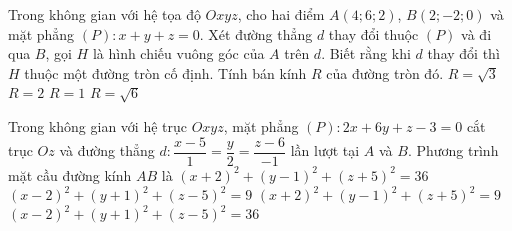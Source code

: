 \begin{ex}%
	Trong không gian với hệ tọa độ $Oxyz$, cho hai điểm $A(4;6;2)$, $B(2;-2;0)$ và mặt phẳng $(P)\colon x+y+z=0$. Xét đường thẳng $d$ thay đổi thuộc $(P)$ và đi qua $B$, gọi $H$ là hình chiếu vuông góc của $A$ trên $d$. Biết rằng khi $d$ thay đổi thì $H$ thuộc một đường tròn cố định. Tính bán kính $R$ của đường tròn đó.
	\choice 
		{$R=\sqrt{3}$}
		{$R=2$}
		{$R=1$}
		{\True $R=\sqrt{6}$}
\end{ex}

\begin{ex}%
	Trong không gian với hệ trục $Oxyz$, mặt phẳng $(P)\colon 2x+6y+z-3=0$ cắt trục $Oz$ và đường thẳng $d\colon \dfrac{x-5}{1}=\dfrac{y}{2}=\dfrac{z-6}{-1}$ lần lượt tại $A$ và $B$. Phương trình mặt cầu đường kính $AB$ là
	\choice 						
		{$(x+2)^2+(y-1)^2+(z+5)^2=36$}
		{\True $(x-2)^2+(y+1)^2+(z-5)^2=9$}
		{$(x+2)^2+(y-1)^2+(z+5)^2=9$}
		{$(x-2)^2+(y+1)^2+(z-5)^2=36$}
\end{ex}

